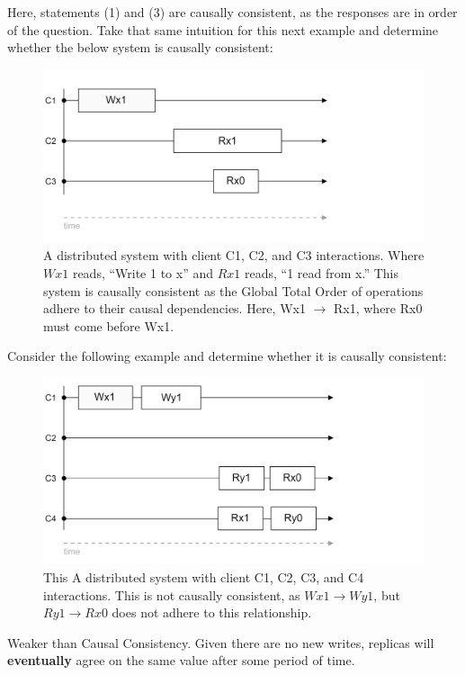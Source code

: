\noindent
Here, statements (1) and (3) are causally consistent, as the responses are in order of the question. Take 
that same intuition for this next example and determine whether the below system is causally consistent:

\begin{figure}[h]
    \centering
    \includegraphics[width=.9\textwidth]{Sections/consist/cas1.png}
    \caption{A distributed system with client C1, C2, and C3 interactions. Where $Wx1$ reads, ``Write 1 to x'' and $Rx1$ reads, ``1 read from x.'' This 
    system is causally consistent as the Global Total Order of operations adhere to their causal dependencies. Here, Wx1 $\rightarrow$ Rx1, where Rx0 must come before Wx1.}
\end{figure}

\newpage 

\noindent
Consider the following example and determine whether it is causally consistent:
\begin{figure}[h] 
    \centering
    \includegraphics[width=.9\textwidth]{Sections/consist/seq3.png}
    \caption{This 
    A distributed system with client C1, C2, C3, and C4 interactions. This is not causally consistent, as $Wx1\to Wy1$, but $Ry1\to Rx0$ does not adhere to this relationship.}
\end{figure}

\begin{Def}
    
    Weaker than Causal Consistency. Given there are no new writes, replicas will \textbf{eventually} agree on the same value 
    after some period of time.
\end{Def}


